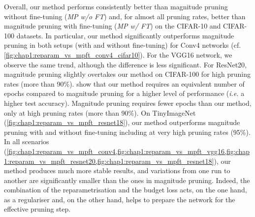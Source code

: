 Overall, our method performs consistently better than magnitude pruning without
fine-tuning (\emph{MP w/o FT}) and, for almost all pruning rates, better than
magnitude pruning with fine-tuning (\emph{MP w/ FT}) on the CIFAR-10 and
CIFAR-100 datasets. In particular, our method significantly outperforms
magnitude pruning in both setups (with and without fine-tuning) for Conv4
networks (cf. \cref{fig:chap1:reparam_vs_mpft_conv4_cifar10}). For the VGG16
network, we observe the same trend, although the difference is less significant.
For ResNet20, magnitude pruning slightly overtakes our method on CIFAR-100 for
high pruning rates (more than 90\%).
show that our method requires an equivalent number of epochs compared to
magnitude pruning for a higher level of performance (\textit{i.e.} a higher test
accuracy). Magnitude pruning requires fewer epochs than our method, only at high
pruning rates (more than 90\%). On TinyImageNet
(\cref{fig:chap1:reparam_vs_mpft_resnet18}), our method outperforms magnitude
pruning with and without fine-tuning including at very high pruning rates
(95\%). In all scenarios
(\cref{fig:chap1:reparam_vs_mpft_conv4,fig:chap1:reparam_vs_mpft_vgg16,fig:chap1:reparam_vs_mpft_resnet20,fig:chap1:reparam_vs_mpft_resnet18}),
our method produces much more stable results, and variations from one run to
another are significantly smaller than the ones in magnitude pruning. Indeed,
the combination of the reparametrisation and the budget loss acts, on the one
hand, as a regulariser and, on the other hand, helps to prepare the network for
the effective pruning step.\\

